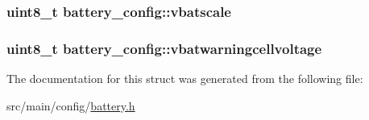 \hypertarget{structbattery__config_a441f91ab82da0517bfc54d4d875e2628}{
\subsubsection[{vbatscale}]{\setlength{\rightskip}{0pt plus 5cm}uint8\+\_\+t battery\+\_\+config\+::vbatscale}}\label{structbattery__config_a441f91ab82da0517bfc54d4d875e2628}
\hypertarget{structbattery__config_aa0caa88312f033e9f5bc6d904fb62712}{
\subsubsection[{vbatwarningcellvoltage}]{\setlength{\rightskip}{0pt plus 5cm}uint8\+\_\+t battery\+\_\+config\+::vbatwarningcellvoltage}}\label{structbattery__config_aa0caa88312f033e9f5bc6d904fb62712}


The documentation for this struct was generated from the following file\+:\begin{DoxyCompactItemize}
\item 
src/main/config/\hyperlink{config_2battery_8h}{battery.\+h}\end{DoxyCompactItemize}
